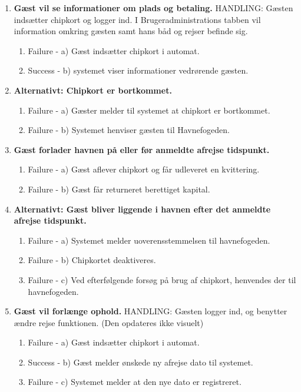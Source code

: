 \begin{enumerate}
	\item{\bf{Gæst vil se informationer om plads og betaling.}}
		HANDLING: Gæsten indsætter chipkort og logger ind. I Brugeradministrations tabben vil information omkring gæsten samt hans båd og rejser befinde sig.
	  \begin{enumerate}
			\item Failure -  a) Gæst indsætter chipkort i automat.
			\item Success -  b) systemet viser informationer vedrørende gæsten.
	   \end{enumerate}
     
	\item{\bf{Alternativt: Chipkort er bortkommet.}}
	  \begin{enumerate}
			\item Failure -  a) Gæster melder til systemet at chipkort er bortkommet.
			\item Failure -  b) Systemet henviser gæsten til Havnefogeden.
	   \end{enumerate}
     
	\item{\bf{Gæst forlader havnen på eller før anmeldte afrejse tidspunkt.}}
	  \begin{enumerate}
			\item Failure -  a) Gæst aflever chipkort og får udleveret en kvittering.
			\item Failure -  b) Gæst får returneret berettiget kapital.
	   \end{enumerate}
    
	\item{\bf{Alternativt: Gæst bliver liggende i havnen efter det anmeldte afrejse tidspunkt.}}
	  \begin{enumerate}
			\item Failure -  a) Systemet melder uoverensstemmelsen til havnefogeden.
			\item Failure -  b) Chipkortet deaktiveres.
			\item Failure -  c) Ved efterfølgende forsøg på brug af chipkort, henvendes der til havnefogeden.
	   \end{enumerate}
			
	\item{\bf{Gæst vil forlænge ophold.}}
		HANDLING: Gæsten logger ind, og benytter ændre rejse funktionen. (Den opdateres ikke visuelt)
	  \begin{enumerate}
			\item Failure -  a) Gæst indsætter chipkort i automat.
			\item Success -  b) Gæst melder ønskede ny afrejse dato til systemet.
			\item Failure -  c) Systemet melder at den nye dato er registreret.
	   \end{enumerate}
     

\end{enumerate}

